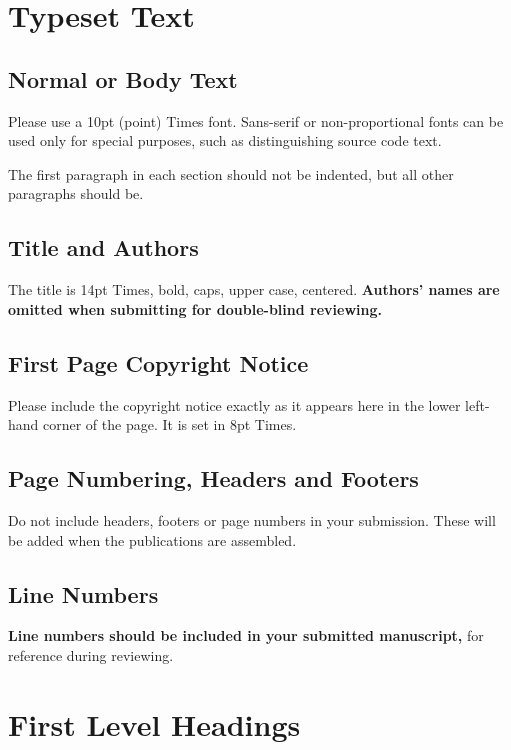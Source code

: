 \documentclass{article}
\begin{document}
\section{Typeset Text}\label{sec:typeset_text}

\subsection{Normal or Body Text}\label{subsec:body}

Please use a 10pt (point) Times font. Sans-serif or non-proportional fonts can be used only for special purposes, such as distinguishing source code text.

The first paragraph in each section should not be indented, but all other paragraphs should be.

\subsection{Title and Authors}

The title is 14pt Times, bold, caps, upper case, centered. \textbf{Authors' names are omitted when submitting for double-blind reviewing.}

\subsection{First Page Copyright Notice}

Please include the copyright notice exactly as it appears here in the lower left-hand corner of the page. It is set in 8pt Times.


\subsection{Page Numbering, Headers and Footers}

Do not include headers, footers or page numbers in your submission. These will be added when the publications are assembled.

\subsection{Line Numbers}

\textbf{Line numbers should be included in your submitted manuscript,} for reference during reviewing.

\section{First Level Headings}
\end{document}
